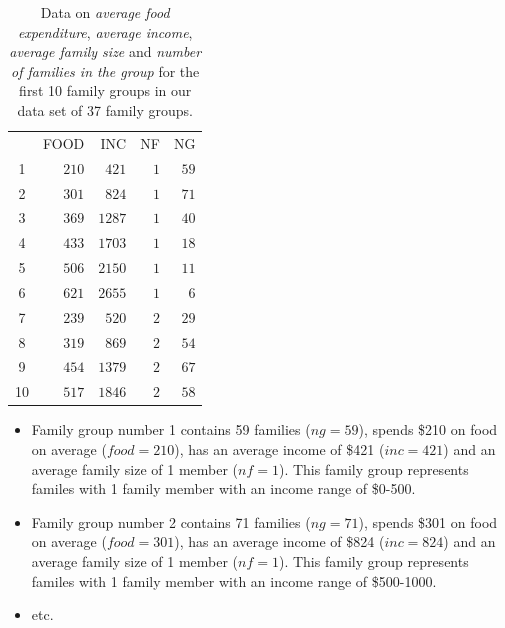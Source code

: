 \documentclass[12pt]{report}
\begin{document}
\begin{table}[H]
	\centering
	\begin{tabular}{lrrrr}
		\multicolumn{1}{c}{}&\multicolumn{1}{r}{FOOD}&\multicolumn{1}{r}{INC}&\multicolumn{1}{r}{NF}&\multicolumn{1}{r}{NG}\\
		\multicolumn{1}{c}{1}&\multicolumn{1}{r}{$210$}&\multicolumn{1}{r}{$421$}&\multicolumn{1}{r}{$1$}&\multicolumn{1}{r}{$59$}\\
		\multicolumn{1}{c}{2}&\multicolumn{1}{r}{$301$}&\multicolumn{1}{r}{$824$}&\multicolumn{1}{r}{$1$}&\multicolumn{1}{r}{$71$}\\
		\multicolumn{1}{c}{3}&\multicolumn{1}{r}{$369$}&\multicolumn{1}{r}{$1287$}&\multicolumn{1}{r}{$1$}&\multicolumn{1}{r}{$40$}\\
		\multicolumn{1}{c}{4}&\multicolumn{1}{r}{$433$}&\multicolumn{1}{r}{$1703$}&\multicolumn{1}{r}{$1$}&\multicolumn{1}{r}{$18$}\\
		\multicolumn{1}{c}{5}&\multicolumn{1}{r}{$506$}&\multicolumn{1}{r}{$2150$}&\multicolumn{1}{r}{$1$}&\multicolumn{1}{r}{$11$}\\
		\multicolumn{1}{c}{6}&\multicolumn{1}{r}{$621$}&\multicolumn{1}{r}{$2655$}&\multicolumn{1}{r}{$1$}&\multicolumn{1}{r}{$6$}\\
		\multicolumn{1}{c}{7}&\multicolumn{1}{r}{$239$}&\multicolumn{1}{r}{$520$}&\multicolumn{1}{r}{$2$}&\multicolumn{1}{r}{$29$}\\
		\multicolumn{1}{c}{8}&\multicolumn{1}{r}{$319$}&\multicolumn{1}{r}{$869$}&\multicolumn{1}{r}{$2$}&\multicolumn{1}{r}{$54$}\\
		\multicolumn{1}{c}{9}&\multicolumn{1}{r}{$454$}&\multicolumn{1}{r}{$1379$}&\multicolumn{1}{r}{$2$}&\multicolumn{1}{r}{$67$}\\
		\multicolumn{1}{c}{10}&\multicolumn{1}{r}{$517$}&\multicolumn{1}{r}{$1846$}&\multicolumn{1}{r}{$2$}&\multicolumn{1}{r}{$58$}\\
	\end{tabular}
	\caption{Data on \textit{average food expenditure}, \textit{average income}, \textit{average family size} and \textit{number of families in the group} for the first 10 family groups in our data set of 37 family groups.}
\end{table}
\vspace{-\baselineskip}
\begin{itemize}
	\item Family group number 1 contains 59 families ($ng = 59$), spends \$210 on food on average ($food = 210$), has an average income of \$421 ($inc = 421$) and an average family size of 1 member ($nf = 1$). This family group represents familes with 1 family member with an income range of \$0-500.
	\item Family group number 2 contains 71 families ($ng = 71$), spends \$301 on food on average ($food = 301$), has an average income of \$824 ($inc = 824$) and an average family size of 1 member ($nf = 1$). This family group represents familes with 1 family member with an income range of \$500-1000.
	\item etc.
\end{itemize}
\end{document}
